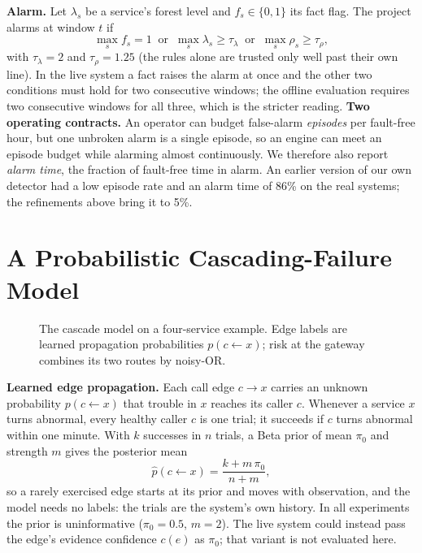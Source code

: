 \documentclass[journal]{IEEEtran}
\begin{document}
\textbf{Alarm.} Let $\lambda_s$ be a service's forest level and $f_s\in\{0,1\}$ its fact flag. The project alarms at window $t$ if
\begin{equation}
\max_s f_s=1\;\;\text{or}\;\;\max_s\lambda_s\ge\tau_\lambda\;\;\text{or}\;\;\max_s\rho_s\ge\tau_\rho,
\end{equation}
with $\tau_\lambda{=}2$ and $\tau_\rho{=}1.25$ (the rules alone are trusted only well past their own line). In the live system a fact raises
the alarm at once and the other two conditions must hold for two consecutive windows; the offline evaluation requires two consecutive windows for all three, which is the
stricter reading. \textbf{Two operating contracts.} An operator can budget false-alarm \emph{episodes} per fault-free hour,
but one unbroken alarm is a single episode, so an engine can meet an episode budget while alarming almost continuously. We
therefore also report \emph{alarm time}, the fraction of fault-free time in alarm. An earlier version of our own detector had a low
episode rate and an alarm time of 86\% on the real systems; the refinements above bring it to 5\%.

\section{A Probabilistic Cascading-Failure Model}
\label{sec:cascade}
\begin{figure}[!t]
\centering

\caption{The cascade model on a four-service example. Edge labels are learned propagation probabilities $p(c\!\leftarrow\!x)$;
risk at the gateway combines its two routes by noisy-OR.}
\label{fig:prop}
\end{figure}
\textbf{Learned edge propagation.} Each call edge $c\!\to\!x$ carries an unknown probability $p(c\!\leftarrow\!x)$ that trouble in $x$
reaches its caller $c$. Whenever a service $x$ turns abnormal, every healthy caller $c$ is one trial; it succeeds if $c$ turns
abnormal within one minute. With $k$ successes in $n$ trials, a Beta prior of mean $\pi_0$ and strength $m$ gives the posterior mean
\begin{equation}
\hat p(c\!\leftarrow\!x)=\frac{k+m\,\pi_0}{n+m},
\end{equation}
so a rarely exercised edge starts at its prior and moves with observation, and the model needs no labels: the trials are the
system's own history. In all experiments the prior is uninformative ($\pi_0{=}0.5$, $m{=}2$). The live system could instead pass the edge's evidence confidence
$c(e)$ as $\pi_0$; that variant is not evaluated here.
\end{document}
